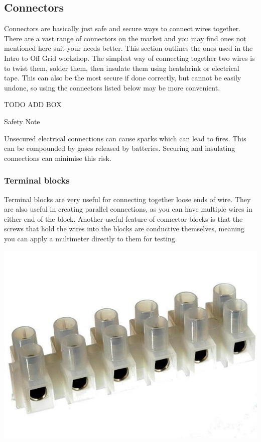 \documentclass{article}
\theoremstyle{definition}
\theoremstyle{definition}
\theoremstyle{remark}
\begin{document}

  {\color{blue}\subsection{Connectors}} %
  \label{sub:connectors}

    Connectors are basically just safe and secure ways to connect wires together. There are a vast range of connectors on the market and you may find ones not mentioned here suit your needs better. This section outlines the ones used in the Intro to Off Grid workshop. The simplest way of connecting together two wires is to twist them, solder them, then insulate them using heatshrink or electrical tape. This can also be the most secure if done correctly, but cannot be easily undone, so using the connectors listed below may be more convenient.

    TODO ADD BOX

    Safety Note
     
    Unsecured electrical connections can cause sparks which can lead to fires. This can be compounded by gases released by batteries. Securing and insulating connections can minimise this risk.
  
    \subsubsection{Terminal blocks} %
    \label{ssub:terminal_blocks}

      Terminal blocks are very useful for connecting together loose ends of wire. They are also useful in creating parallel connections, as you can have multiple wires in either end of the block. Another useful feature of connector blocks is that the screws that hold the wires into the blocks are conductive themselves, meaning you can apply a multimeter directly to them for testing.

      \begin{center}
        \includegraphics[width=0.15\paperwidth]{../Images/image_8_3_(terminal_connector).png}
      \end{center}
\end{document}
